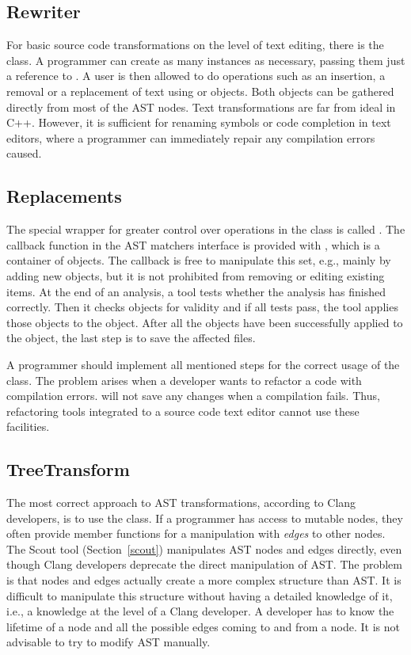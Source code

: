 \subsection{Rewriter}
For basic source code transformations on the level of text editing, there is the  class. A programmer can create as many instances as necessary, passing them just a reference to . A user is then allowed to do operations such as an insertion, a removal or a replacement of text using  or  objects. Both objects can be gathered directly from most of the AST nodes. Text transformations are far from ideal in C++. However, it is sufficient for renaming symbols or code completion in text editors, where a programmer can immediately repair any compilation errors caused.

\subsection{Replacements}
The special wrapper for greater control over operations in the  class is called  . The callback function in the AST matchers interface is provided with , which is a container of  objects. The callback is free to manipulate this set, e.g., mainly by adding new objects, but it is not prohibited from removing or editing existing items. At the end of an analysis, a tool tests whether the analysis has finished correctly. Then it checks  objects for validity and if all tests pass, the tool applies those objects to the  object. After all the  objects have been successfully applied to the  object, the last step is to save the affected files.

A programmer should implement all mentioned steps for the correct usage of the  class. The problem arises when a developer wants to refactor a code with compilation errors.  will not save any changes when a compilation fails. Thus, refactoring tools integrated to a source code text editor cannot use these facilities.

\subsection{TreeTransform}
\label{treetransform}
The most correct approach to AST transformations, according to Clang developers, is to use the  class. If a programmer has access to mutable nodes, they often provide member functions for a manipulation with \textit{edges} to other nodes. The Scout tool (Section~\ref{scout}) manipulates AST nodes and edges directly, even though Clang developers deprecate the direct manipulation of AST. The problem is that nodes and edges actually create a more complex structure than AST. It is difficult to manipulate this structure without having a detailed knowledge of it, i.e., a knowledge at the level of a Clang developer. A developer has to know the lifetime of a node and all the possible edges coming to and from a node. It is not advisable to try to modify AST manually.


